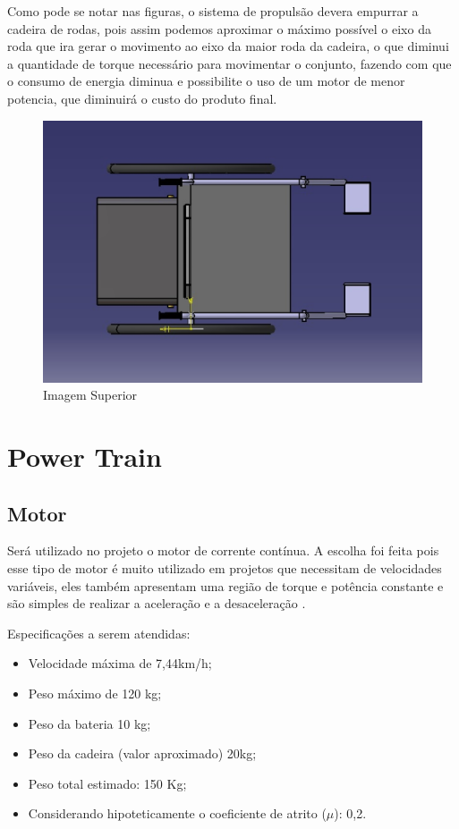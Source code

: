 Como pode se notar nas figuras, o sistema de propulsão devera empurrar a cadeira de rodas, pois assim podemos aproximar o máximo possível o eixo da roda que ira gerar o movimento ao eixo da maior roda da cadeira, o que diminui a quantidade de torque necessário para movimentar o conjunto, fazendo com que o consumo de energia diminua e possibilite o uso de um motor de menor potencia, que diminuirá o custo do produto final.

\begin{figure}[!htb]
\centering
\includegraphics[keepaspectratio=true,scale=0.4]{figuras/estrutura/vista_superior}
\caption{Imagem Superior}
\label{fig:superior}
\end{figure}

\section{Power Train}
\subsection{Motor}

Será utilizado no projeto o motor de corrente contínua. A escolha foi feita pois esse tipo de motor é muito utilizado em projetos que necessitam de velocidades variáveis, eles também apresentam uma região de torque e potência constante e são simples de realizar a aceleração e a desaceleração \cite{manual_bateria_unipower}.

Especificações a serem atendidas:
\begin{itemize}
 \item Velocidade máxima de 7,44km/h;
 \item Peso máximo de 120 kg;
 \item Peso da bateria 10 kg;
 \item Peso da cadeira (valor aproximado) 20kg;
 \item Peso total estimado: 150 Kg;
 \item Considerando hipoteticamente o coeficiente de atrito ($\mu$): 0,2.
\end{itemize}


